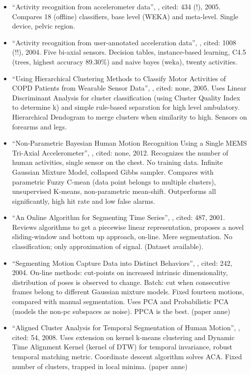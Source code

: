 \begin{itemize}
  \item ``Activity recognition from accelerometer data'', \cite{ravi2005activity}, cited: 434 (!), 2005. Compares 18 (offline) classifiers, base level (WEKA) and meta-level. Single device, pelvic region.
  \item ``Activity recognition from user-annotated acceleration data'', \cite{bao2004activity}, cited: 1008 (!!), 2004. Five bi-axial sensors. Decision tables, instance-based learning, C4.5 (trees, highest accuracy 89.30\%) and naive bayes (weka), twenty activities.
  \item ``Using Hierarchical Clustering Methods to Classify Motor Activities of COPD Patients from Wearable Sensor Data'', \cite{sherril2005using}, cited: none, 2005. Uses Linear Discriminant Analysis for cluster classification (using Cluster Quality Index to determine k) and simple rule-based separation for high level ambulatory. Hierarchical Dendogram to merge clusters when similarity to high. Sensors on forearms and legs.
  \item ``Non-Parametric Bayesian Human Motion Recognition Using a Single MEMS Tri-Axial Accelerometer'', \cite{ahmed2012non}, cited: none, 2012. Recognizes the number of human activities, single sensor on the chest. No training data. Infinite Gaussian Mixture Model, collapsed Gibbs sampler. Compares with parametric Fuzzy C-mean (data point belongs to multiple clusters), unsupervised K-means, non-parametric mean-shift. Outperforms all significantly, high hit rate and low false alarms.
  \item ``An Online Algorithm for Segmenting Time Series'', \cite{keogh2001online}, cited: 487, 2001. Reviews algorithms to get a piecewise linear representation, proposes a novel sliding-window and bottom up approach, on-line. Mere segmentation. No classification; only approximation of signal. (Dataset available).
  \item ``Segmenting Motion Capture Data into Distinct Behaviors'', \cite{barbivc2004segmenting}, cited: 242, 2004. On-line methods: cut-points on increased intrinsic dimensionality, distribution of poses is observed to change. Batch: cut when consecutive frames belong to different Gaussian mixture models. Fixed fourteen motions, compared with manual segmentation. Uses PCA and Probabilistic PCA (models the non-pc subspaces as noise). PPCA is the best. (paper anne)
  \item ``Aligned Cluster Analysis for Temporal Segmentation of Human Motion'', \cite{zhou2008aligned}, cited: 54, 2008. Uses extension on kernel k-means clustering and Dynamic Time Alignment Kernel (kernel of DTW) for temporal invariance, robust temporal matching metric. Coordinate descent algorithm solves ACA. Fixed number of clusters, trapped in local minima. (paper anne)

\end{itemize}

